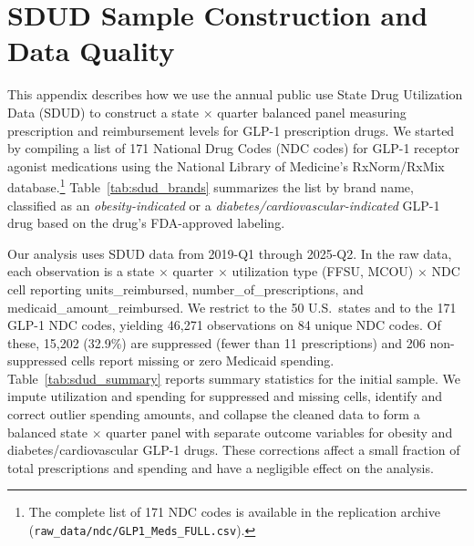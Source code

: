 \section{SDUD Sample Construction and Data Quality}
\label{sec:appendix_c}

This appendix describes how we use the annual public use State Drug Utilization Data (SDUD) to construct a state $\times$ quarter balanced panel measuring prescription and reimbursement levels for GLP-1 prescription drugs. We started by compiling a list of 171 National Drug Codes (NDC codes) for GLP-1 receptor agonist medications using the National Library of Medicine's RxNorm/RxMix database.\footnote{The complete list of 171 NDC codes is available in the replication archive (\texttt{raw\_data/ndc/GLP1\_Meds\_FULL.csv}).} Table~\ref{tab:sdud_brands} summarizes the list by brand name, classified as an \emph{obesity-indicated} or a \emph{diabetes/cardiovascular-indicated} GLP-1 drug based on the drug's FDA-approved labeling.

Our analysis uses SDUD data from 2019-Q1 through 2025-Q2. In the raw data, each observation is a state $\times$ quarter $\times$ utilization type (FFSU, MCOU) $\times$ NDC cell reporting units\_reimbursed, number\_of\_prescriptions, and medicaid\_amount\_reimbursed. We restrict to the 50 U.S.\ states and to the 171 GLP-1 NDC codes, yielding 46{,}271 observations on 84 unique NDC codes. Of these, 15{,}202 (32.9\%) are suppressed (fewer than 11 prescriptions) and 206 non-suppressed cells report missing or zero Medicaid spending. Table~\ref{tab:sdud_summary} reports summary statistics for the initial sample. We impute utilization and spending for suppressed and missing cells, identify and correct outlier spending amounts, and collapse the cleaned data to form a balanced state $\times$ quarter panel with separate outcome variables for obesity and diabetes/cardiovascular GLP-1 drugs. These corrections affect a small fraction of total prescriptions and spending and have a negligible effect on the analysis.

